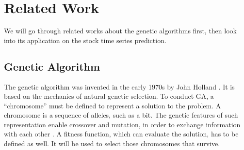 \documentclass{article}
\begin{document}



\section{Related Work}

We will go through related works about the genetic algorithms first,
then look into its application on the stock time series prediction.

\subsection{Genetic Algorithm}

The genetic algorithm was invented in the early 1970s by John Holland \cite{genetic-algorithm-review-and-application}.
It is based on the mechanics of natural genetic selection.
To conduct GA, a ``chromosome'' must be defined to represent a solution to the problem.
A chromosome is a sequence of alleles, such as a bit.
The genetic features of such representation enable crossover and mutation,
in order to exchange information with each other \cite{an-object-oriented-environment-for-specification}.
A fitness function, which can evaluate the solution, has to be defined as well.
It will be used to select those chromosomes that survive.
\end{document}
